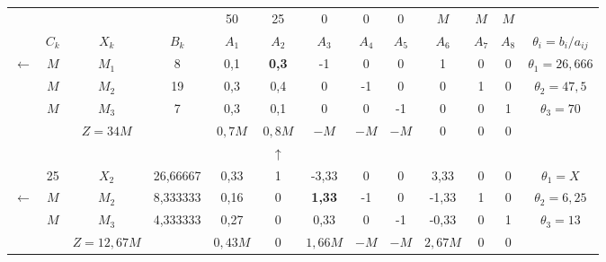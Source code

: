     \begin{tabular}{ccccccccccccc}
\cline{2-13}            &         &         &         & 50      & 25      & 0       & 0       & 0       & $M$     & $M$     & $M$     &  \bigstrut[t]\\
            & $C_k$   & $X_k$   & $B_k$   & $A_1$   & $A_2$   & $A_3$   & $A_4$   & $A_5$   & $A_6$   & $A_7$   & $A_8$   & $\theta_i = b_i/a_{ij}$ \bigstrut[b]\\
\cline{2-13}    $\leftarrow$ & $M$     & \textcolor[rgb]{ 1,  0,  0}{\boldmath{}\textbf{$M_1$}\unboldmath{}} & 8       & 0,1     & \textbf{0,3} & -1      & 0       & 0       & 1       & 0       & 0       & \boldmath{}\textbf{$\theta_1 = 26,666$}\unboldmath{} \bigstrut[t]\\
            & $M$     & $M_2$   & 19      & 0,3     & 0,4     & 0       & -1      & 0       & 0       & 1       & 0       & $\theta_2 = 47,5$ \\
            & $M$     & $M_3$   & 7       & 0,3     & 0,1     & 0       & 0       & -1      & 0       & 0       & 1       & $\theta_3 = 70$ \bigstrut[b]\\
\cline{2-13}            &         & $Z=34M$ &         & $0,7 M$ & \textcolor[rgb]{ 0,  .439,  .753}{\boldmath{}\textbf{$0,8 M$}\unboldmath{}} & $-M$    & $-M$    & $-M$    & 0       & 0       & 0       &  \bigstrut\\
\cline{2-13}            &         &         &         &         & $\uparrow$ &         &         &         &         &         &         &  \bigstrut\\
\cline{2-13}            & 25      & $X_2$   & 26,66667 & 0,33    & 1       & -3,33   & 0       & 0       & 3,33    & 0       & 0       & $\theta_1 = X$ \bigstrut[t]\\
    $\leftarrow$ & $M$     & \textcolor[rgb]{ 1,  0,  0}{\boldmath{}\textbf{$M_2$}\unboldmath{}} & 8,333333 & 0,16    & 0       & \textbf{1,33} & -1      & 0       & -1,33   & 1       & 0       & \boldmath{}\textbf{$\theta_2 = 6,25$}\unboldmath{} \\
            & $M$     & $M_3$   & 4,333333 & 0,27    & 0       & 0,33    & 0       & -1      & -0,33   & 0       & 1       & $\theta_3 = 13$ \bigstrut[b]\\
\cline{2-13}            &         & $Z=12,67 M$ &         & $0,43 M$ & 0       & \textcolor[rgb]{ 0,  .439,  .753}{\boldmath{}\textbf{$1,66 M$}\unboldmath{}} & $-M$    & $-M$    & $2,67 M$ & 0       & 0       &  \bigstrut\\

\end{tabular}
